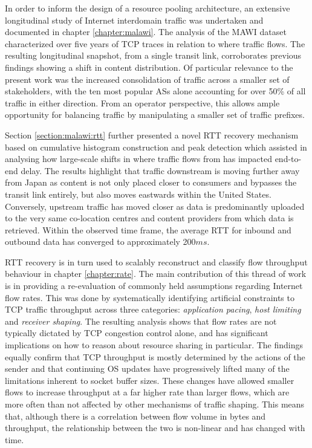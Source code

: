 In order to inform the design of a resource pooling architecture, an extensive longitudinal study of Internet interdomain traffic was undertaken and documented in chapter \ref{chapter:malawi}.
The analysis of the \ac{MAWI} dataset characterized over five years of TCP traces in relation to where traffic flows. 
The resulting longitudinal snapshot, from a single transit link, corroborates previous findings \cite{Labovitz:2010p175} showing a shift in content distribution.
Of particular relevance to the present work was the increased consolidation of traffic across a smaller set of stakeholders, with the ten most popular \acp{AS} alone accounting for over 50\% of all traffic in either direction.
From an operator perspective, this allows ample opportunity for balancing traffic by manipulating a smaller set of traffic prefixes.

Section \ref{section:malawi:rtt} further presented a novel \ac{RTT} recovery mechanism based on cumulative histogram construction and peak detection which assisted in analysing how large-scale shifts in where traffic flows from has impacted end-to-end delay.
The results highlight that traffic downstream is moving further away from Japan as content is not only placed closer to consumers and bypasses the transit link entirely, but also moves eastwards within the United States.
Conversely, upstream traffic has moved closer as data is predominantly uploaded to the very same co-location centres and content providers from which data is retrieved.
Within the observed time frame, the average \ac{RTT} for inbound and outbound data has converged to approximately 200$ms$.

\ac{RTT} recovery is in turn used to scalably reconstruct and classify flow throughput behaviour in chapter \ref{chapter:rate}.
The main contribution of this thread of work is in providing a re-evaluation of commonly held assumptions regarding Internet flow rates.
This was done by systematically identifying artificial constraints to \ac{TCP} traffic throughput across three categories: \emph{application pacing}, \emph{host limiting} and \emph{receiver shaping}. 
The resulting analysis shows that flow rates are not typically dictated by \ac{TCP} congestion control alone, and has significant implications on how to reason about resource sharing in particular.
The findings equally confirm that \ac{TCP} throughput is mostly determined by the actions of the sender and that continuing \acl{OS} updates have progressively lifted many of the limitations inherent to socket buffer sizes. 
These changes have allowed smaller flows to increase throughput at a far higher rate than larger flows, which are more often than not affected by other mechanisms of traffic shaping.
This means that, although there is a correlation between flow volume in bytes and throughput, the relationship between the two is non-linear and has changed with time.

